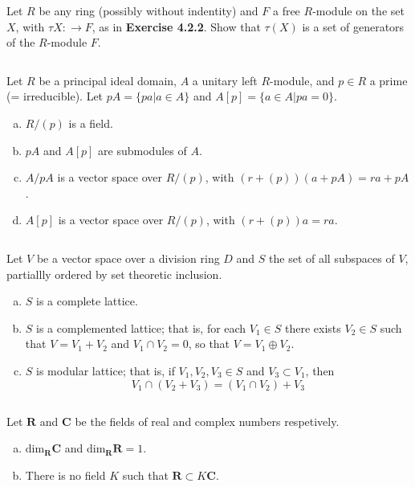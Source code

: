\begin{ex}
    Let $R$ be any ring (possibly without indentity) and $F$ a free $R$-module on the set $X$, with $\tau X:\to F$, as in \textbf{Exercise 4.2.2}. Show that $\tau(X)$ is a set of generators of the $R$-module $F$.
\end{ex}

$$ $$

\begin{ex}
    Let $R$ be a principal ideal domain, $A$ a unitary left $R$-module, and $p\in R$ a prime (= irreducible). Let $pA=\{pa|a\in A\}$ and $A[p]=\{a\in A|pa=0\}$.
    \begin{enumerate}[(a)]
        \item $R/(p)$ is a field.
        \item $pA$ and $A[p]$ are submodules of $A$.
        \item $A /pA$ is a vector space over $R /(p)$, with $(r+(p))(a+pA)=ra+pA$.
        \item $A[p]$ is a vector space over $R /(p)$, with $(r+(p))a=ra$.
    \end{enumerate}
\end{ex}

$$ $$

\begin{ex}
    Let $V$ be a vector space over a division ring $D$ and $S$ the set of all subspaces of $V$, partiallly ordered by set theoretic inclusion.
    \begin{enumerate}[(a)]
        \item $S$ is a complete lattice.
        \item $S$ is a complemented lattice; that is, for each $V_{1}\in S$ there exists $V_{2}\in S$ such that $V=V_{1}+V_{2}$ and $V_{1}\cap V_{2}=0$, so that $V=V_{1}\oplus V_{2}$.
        \item $S$ is modular lattice; that is, if $V_{1}, V_{2}, V_{3}\in S$ and $V_{3}\subset V_{1}$, then \[V_{1}\cap (V_{2}+V_{3})=(V_{1}\cap V_{2})+V_{3}\]
    \end{enumerate}
\end{ex}

$$ $$

\begin{ex}
    Let $\mathbf{R}$ and $\mathbf{C}$ be the fields of real and complex numbers respetively.
    \begin{enumerate}[(a)]
        \item $\mathrm{dim}_{\mathbf{R}}\mathbf{C}$ and $\mathrm{dim}_{\mathbf{R}}\mathbf{R}=1$.
        \item There is no field $K$ such that $\mathbf{R}\subset K\mathbf{C}$.
    \end{enumerate}
\end{ex}

